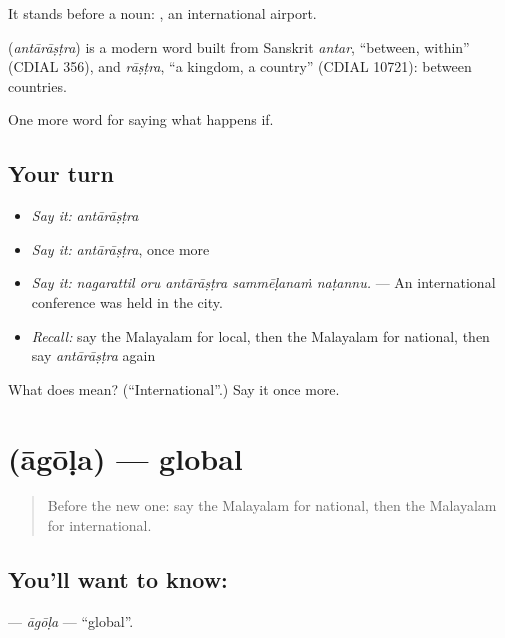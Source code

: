 It stands before a noun:  , an international airport.

\begin{cousinweb}
\textbf{} (\emph{antārāṣṭra}) is a modern word built from Sanskrit \emph{antar}, \textquotedblleft{}between, within\textquotedblright{} (CDIAL 356), and \emph{rāṣṭra}, \textquotedblleft{}a kingdom, a country\textquotedblright{} (CDIAL 10721): between countries.
\end{cousinweb}

\begin{grammarlens}[title={What you've built}]
One more word for saying what happens if.
\end{grammarlens}

\subsection*{Your turn}
\begin{itemize}
\raggedright
  \item \emph{Say it:} \emph{antārāṣṭra}
  \item \emph{Say it:} \emph{antārāṣṭra}, once more
  \item \emph{Say it:} \emph{nagarattil oru antārāṣṭra sammēḷanaṁ naṭannu.} — An international conference was held in the city.
  \item \emph{Recall:} say the Malayalam for local, then the Malayalam for national, then say \emph{antārāṣṭra} again
\end{itemize}

\begin{tcolorbox}[breakable,colback=teal!4,colframe=teal!35!black,title={Before you move on}]
What does  mean? (\textquotedblleft{}International\textquotedblright{}.) Say it once more.
\end{tcolorbox}
\section[\texorpdfstring{\ml{ആഗോള} (āgōḷa)}{ആഗോള (āgōḷa)}]{ (āgōḷa) — global}

\label{lesson:ML-C460-agola}



\begin{quote}
Before the new one: say the Malayalam for national, then the Malayalam for international.
\end{quote}

\subsection*{You'll want to know: }
\textbf{} — \emph{āgōḷa} — \textquotedblleft{}global\textquotedblright{}.


